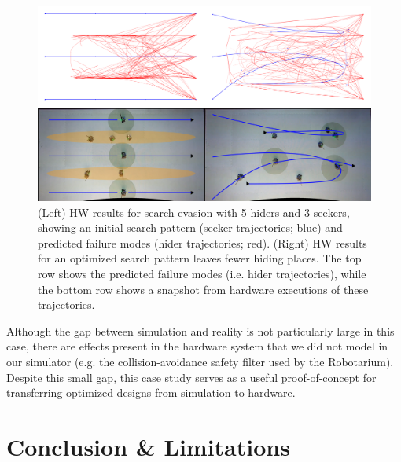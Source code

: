 \begin{figure}[tb]
    \centering
    \includegraphics[width=\linewidth]{images/corl/hw_results.png}
    \caption{(Left) HW results for search-evasion with 5 hiders and 3 seekers, showing an initial search pattern (seeker trajectories; blue) and predicted failure modes (hider trajectories; red). (Right) HW results for an optimized search pattern leaves fewer hiding places. The top row shows the predicted failure modes (i.e. hider trajectories), while the bottom row shows a snapshot from hardware executions of these trajectories.}
    \label{fig:hw_experimental_results}
\end{figure}

Although the gap between simulation and reality is not particularly large in this case, there are effects present in the hardware system that we did not model in our simulator (e.g. the collision-avoidance safety filter used by the Robotarium). Despite this small gap, this case study serves as a useful proof-of-concept for transferring optimized designs from simulation to hardware.
%



\section{Conclusion \& Limitations}

